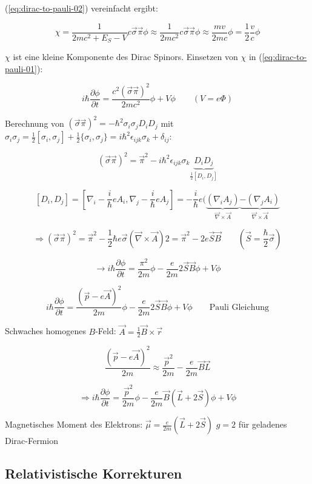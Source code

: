 (\ref{eq:dirac-to-pauli-02}) vereinfacht ergibt:

\[\chi =  \frac{1}{2mc^2+E_S-V} c\vec\sigma\vec\pi\phi \approx   \frac{1}{2mc^2} c\vec\sigma\vec\pi\phi\approx \frac{mv}{2mc}\phi = \frac{1}{2}\frac{v}{c}\phi\]

 \(\chi\) ist eine kleine Komponente des Dirac Spinors. Einsetzen von \(\chi\) in (\ref{eq:dirac-to-pauli-01}):

\[i\hbar \frac{\partial \phi}{\partial t} = \frac{c^2(\vec\sigma\vec\pi)^2}{2mc^2}\phi+V\phi\qquad (V=e\Phi)\]

Berechnung von \((\vec\sigma\vec\pi)^2=-\hbar^2\sigma_i\sigma_jD_iD_j\) mit \(\sigma_i\sigma_j =\frac{1}{2}[\sigma_i,\sigma_j]+\frac{1}{2}\{\sigma_i,\sigma_j\} = i\hbar^2\epsilon_{ijk}\sigma_k+\delta_{ij}\):

\[(\vec\sigma\vec\pi)^2=\vec\pi^2 -i\hbar^2\epsilon_{ijk}\sigma_k \underbrace{D_iD_j}_{\frac{1}{2}[D_i,D_j]} \]

\[[D_i,D_j]=[\nabla_i-\frac{i}{\hbar}eA_i,\nabla_j-\frac{i}{\hbar}eA_j ] = -\frac{i}{\hbar}e(\underbrace{(\nabla_iA_j)}_{\vec\nabla\times\vec A}\underbrace{-(\nabla_j A_i)}_{\vec\nabla\times\vec A}\]

\[\Rightarrow (\vec\sigma\vec\pi)^2 = \vec \pi^2 -\frac{1}{2}\hbar e \vec\sigma (\vec\nabla\times\vec A)2= \vec \pi^2 -2e\vec S\vec B \qquad (\vec S=\frac{\hbar}{2}\vec\sigma)\]


\[\rightarrow i\hbar \frac{\partial \phi}{\partial t} = \frac{\pi^2}{2m}\phi - \frac{e}{2m}2\vec S\vec B\phi + V\phi\]

\[\boxed{i\hbar \frac{\partial \phi}{\partial t} = \frac{(\vec p - e\vec A)^2}{2m}\phi - \frac{e}{2m}2\vec S\vec B\phi+V\phi } \qquad \text{Pauli Gleichung}\]


Schwaches homogenes \(B\)-Feld: \(\vec A = \frac{1}{2}\vec B\times\vec r\)

\[  \frac{(\vec p - e\vec A)^2}{2m} \approx \frac{\vec p^2}{2m} -\frac{e}{2m}\vec B\vec L\]

\[\Rightarrow i\hbar  \frac{\partial \phi}{\partial t} = \frac{\vec p^2}{2m}\phi -\frac{e}{2m}\vec B(\vec L+2\vec S)\phi + V\phi \]


Magnetisches Moment des Elektrons: \(\vec\mu = \frac{e}{2m}(\vec L+2\vec S)\) \(g=2\) für geladenes Dirac-Fermion



\subsection{Relativistische Korrekturen}

